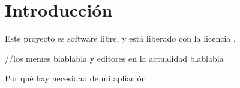 \chapter{Introducción}

Este proyecto es software libre, y está liberado con la licencia \cite{gplv3}.

//los memes blablabla y editores en la actualidad blablabla

Por qué hay necesidad de mi apliación 